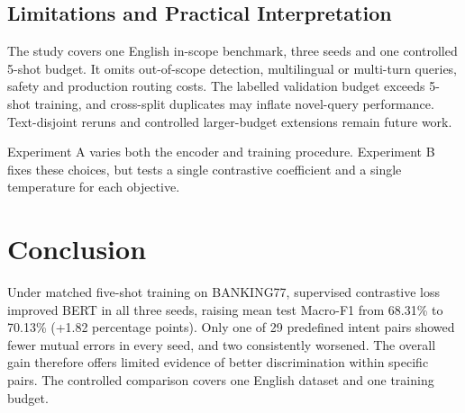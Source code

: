 \documentclass[runningheads]{llncs}
\begin{document}
\subsection{Limitations and Practical Interpretation}
The study covers one English in-scope benchmark, three seeds and one controlled 5-shot budget. It omits out-of-scope detection, multilingual or multi-turn queries, safety and production routing costs. The labelled validation budget exceeds 5-shot training, and cross-split duplicates may inflate novel-query performance. Text-disjoint reruns and controlled larger-budget extensions remain future work.

Experiment A varies both the encoder and training procedure. Experiment B fixes these choices, but tests a single contrastive coefficient and a single temperature for each objective.

\section{Conclusion}
Under matched five-shot training on BANKING77, supervised contrastive loss improved BERT in all three seeds, raising mean test Macro-F1 from 68.31\% to 70.13\% (+1.82 percentage points). Only one of 29 predefined intent pairs showed fewer mutual errors in every seed, and two consistently worsened. The overall gain therefore offers limited evidence of better discrimination within specific pairs. The controlled comparison covers one English dataset and one training budget.
\label{mainend}
\clearpage

\end{document}
